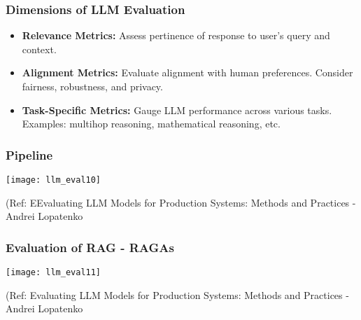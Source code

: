 



\begin{frame}[fragile]\frametitle{Dimensions of LLM Evaluation}
      \begin{itemize}
		\item \textbf{Relevance Metrics:} Assess pertinence of response to user's query and context.
		\item \textbf{Alignment Metrics:} Evaluate alignment with human preferences. Consider fairness, robustness, and privacy.
    \item \textbf{Task-Specific Metrics:} Gauge LLM performance across various tasks. Examples: multihop reasoning, mathematical reasoning, etc.
  \end{itemize}
\end{frame}

\begin{frame}[fragile]\frametitle{Pipeline}

\begin{center}
\texttt{[image: llm\_eval10]}
\end{center}		
		
{\tiny (Ref: EEvaluating LLM Models for Production Systems: Methods and Practices - Andrei Lopatenko}
		
		
\end{frame}

\begin{frame}[fragile]\frametitle{Evaluation of RAG - RAGAs}

\begin{center}
\texttt{[image: llm\_eval11]}
\end{center}		
		

{\tiny (Ref: Evaluating LLM Models for Production Systems: Methods and Practices - Andrei Lopatenko}
			
			
\end{frame}


